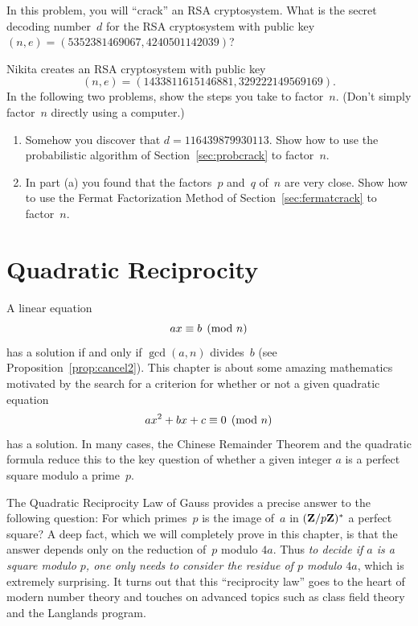 \begin{exercises}

\item\label{ex:crypto5}
In this problem, you will ``crack'' an RSA cryptosystem.
What is the secret decoding number~$d$ for the RSA
cryptosystem with public key $(n,e) = (5352381469067, 4240501142039)$?

\item \label{ex:crypto7}
Nikita creates an RSA cryptosystem with public key
$$(n,e)=(1433811615146881, 329222149569169).$$
In the following two problems, show the steps you take to factor~$n$.
(Don't simply factor~$n$ directly using a computer.)
\begin{enumerate}
\item
Somehow you discover that $d=116439879930113$.  Show how to use the
probabilistic algorithm of Section~\ref{sec:probcrack} to factor~$n$.
\item
In part (a) you found that the factors~$p$ and~$q$ of~$n$ are very close.
Show how to use the Fermat Factorization
 Method of Section~\ref{sec:fermatcrack} to factor~$n$.
\end{enumerate}

\end{exercises}



\chapter{Quadratic Reciprocity}\label{ch:reciprocity}

A linear equation
$$
 ax\equiv b\pmod{n}
$$
has a solution if and only if $\gcd(a,n)$ divides~$b$
(see Proposition~\ref{prop:cancel2}).
This chapter is about some amazing mathematics motivated by
the search for a criterion for whether or not a given quadratic
equation
$$
ax^2 + bx + c \equiv 0\pmod{n}
$$
has a solution.  In many cases, the Chinese Remainder Theorem and
the quadratic formula reduce this to the key question of
whether a given integer $a$ is a perfect square modulo a prime~$p$.

The Quadratic Reciprocity Law of Gauss provides a precise
answer to the following question: For which primes~$p$ is the image
of~$a$ in $(\mathbf{Z}/p\mathbf{Z}{})^*$ a perfect square?  A deep fact, which we will
completely prove in this chapter, is that the answer depends only on
the reduction of~$p$ modulo $4a$.  Thus {\em to decide if $a$ is a
  square modulo $p$, one only needs to consider the residue of $p$
  modulo $4a$}, which is extremely surprising.  It turns out that this
``reciprocity law'' goes to the heart of modern number theory and
touches on advanced topics such as class field theory and the
Langlands program.

